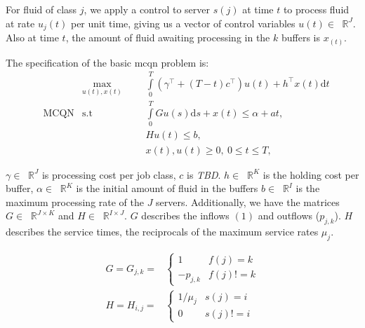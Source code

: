 \documentclass[11pt,a4paper,titlepage]{article}
\newcommand*{\RR}[1]{\ensuremath{\mathop{}\!\mathbb{R}^{#1}}}%
\newcommand\tbd{{\color{orange}\textit{TBD}}}
\theoremstyle{definition}
\begin{document}
For fluid of class $j$,
we apply a control to server $s(j)$ at time $t$
to process fluid at rate $u_j(t)$ per unit time,
giving us a vector of control variables $u(t) \in \RR{J}$.
Also at time $t$,
the amount of fluid awaiting processing in the $k$ buffers is $x_(t)$.

The specification of the basic \gls{mcqn} problem is:
\begin{align} \label{eq:mcqn}%
    && \max\limits_{u(t), x(t)} &&& \int\limits_0^T(\gamma^\top +
      (T-t)c^\top)u(t)+h^\top x(t)\mathrm{d}t \nonumber \\
    & \mbox{MCQN} & \mbox{s.t} &&& \int\limits_0^T G u(s)\mathrm{d}s +
      x(t)   \leq \alpha+at, \\
    &&&&& H u(t) \leq b, \nonumber \\
    &&&&& x(t), u(t) \geq 0, ~ 0 \leq t \leq T, \nonumber
\end{align}


$\gamma \in \RR{J}$ is processing cost per job class,
$c$ is \tbd.
$h \in \RR{K}$ is the holding cost per buffer,
$\alpha \in \RR{K}$ is the initial amount of fluid in the buffers
$b \in \RR{I}$ is the maximum processing rate of the $J$ servers.
Additionally,
we have the matrices $G \in \RR{J \times K}$ and $H \in \RR{I \times J}$.
$G$ describes the inflows $(1)$ and outflows ($p_{j,k}$).
$H$ describes the service times,
the reciprocals of the maximum service rates $\mu_j$.

\begin{align}
    G = G_{j,k} = &
    \begin{cases}
        1 & f(j) = k \\
        -p_{j,k} & f(j) != k
    \end{cases} \\
    H = H_{i,j} = &
\begin{cases}
    1/\mu_j & s(j) = i \\
    0 & s(j) != i
\end{cases}
\end{align}
\end{document}
